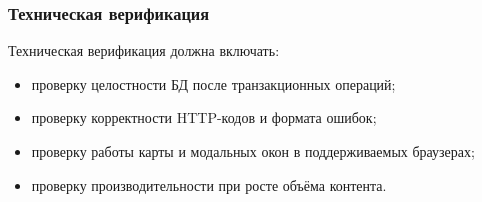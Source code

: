 \subsubsection{Техническая верификация}
Техническая верификация должна включать:
\begin{itemize}
	\item проверку целостности БД после транзакционных операций;
	\item проверку корректности HTTP-кодов и формата ошибок;
	\item проверку работы карты и модальных окон в поддерживаемых браузерах;
	\item проверку производительности при росте объёма контента.
\end{itemize}
